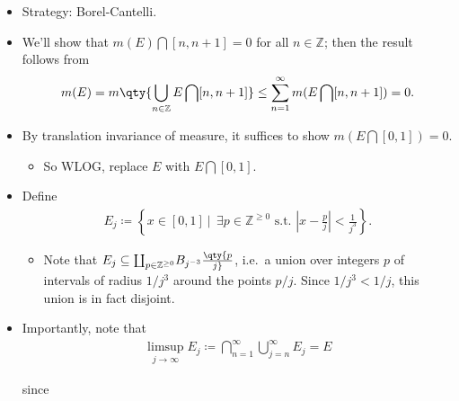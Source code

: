 \begin{solution}

\envlist

\begin{itemize}
\item
  Strategy: Borel-Cantelli.
\item
  We'll show that \(m(E) \displaystyle\bigcap[n, n+1] = 0\) for all
  \(n\in {\mathbb{Z}}\); then the result follows from
  \begin{align*}
  m(E) = m \qty{\displaystyle\bigcup_{n\in {\mathbb{Z}}} E \displaystyle\bigcap[n, n+1]} \leq \sum_{n=1}^\infty m(E \displaystyle\bigcap[n, n+1]) = 0
  .\end{align*}
\item
  By translation invariance of measure, it suffices to show
  \(m(E \displaystyle\bigcap[0, 1]) = 0\).

  \begin{itemize}
  \tightlist
  \item
    So WLOG, replace \(E\) with \(E\displaystyle\bigcap[0, 1]\).
  \end{itemize}
\item
  Define
  \begin{align*}
  E_j \coloneqq\left\{{x\in [0, 1] {~\mathrel{\Big|}~}\
  \exists p\in {\mathbb{Z}}^{\geq 0} \text{ s.t. } {\left\lvert {x - \frac{p}{j} } \right\rvert} < \frac 1 {j^3}}\right\} 
  .\end{align*}

  \begin{itemize}
  \tightlist
  \item
    Note that
    \(E_j \subseteq {\textstyle\coprod}_{p\in {\mathbb{Z}}^{\geq 0}} B_{j^{-3}}\qty{p\over j}\),
    i.e.~a union over integers \(p\) of intervals of radius \(1/j^3\)
    around the points \(p/j\). Since \(1/j^3 < 1/j\), this union is in
    fact disjoint.
  \end{itemize}
\item
  Importantly, note that
  \begin{align*}
  \limsup_{j\to\infty} E_j \coloneqq\displaystyle\bigcap_{n=1}^\infty \displaystyle\bigcup_{j=n}^\infty E_j = E
  \end{align*}

  since


\end{itemize}
\end{solution}
